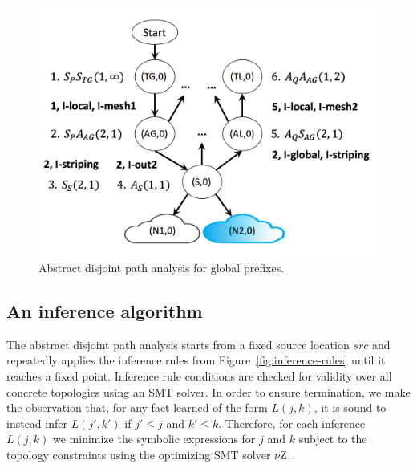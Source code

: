\documentclass[numbers, 10pt, preprint]{sigplanconf}
\begin{document}
\begin{figure}
  \begin{center}
    \includegraphics[width=\columnwidth]{figures/analysis}
  \end{center}
  \vspace{-1.4em}
  \caption{Abstract disjoint path analysis for global prefixes. \label{fig:compilation-times}}
  \label{fig:example-inference}
  \vspace{0em}
\end{figure}

\subsection{An inference algorithm}

The abstract disjoint path analysis starts from a fixed source location $src$ and repeatedly applies the inference rules from Figure~\ref{fig:inference-rules} until it reaches a fixed point. Inference rule conditions are checked for validity over all concrete topologies using an SMT solver. In order to ensure termination, we make the observation that, for any fact learned of the form $L(j,k)$, it is sound to instead infer $L(j',k')$ if $j' \leq j$ and $k' \leq k$. Therefore, for each inference $L(j,k)$ we minimize the symbolic expressions for $j$ and $k$ subject to the topology constraints using the optimizing SMT solver $\nu$Z~\cite{z3opt}.
\end{document}
